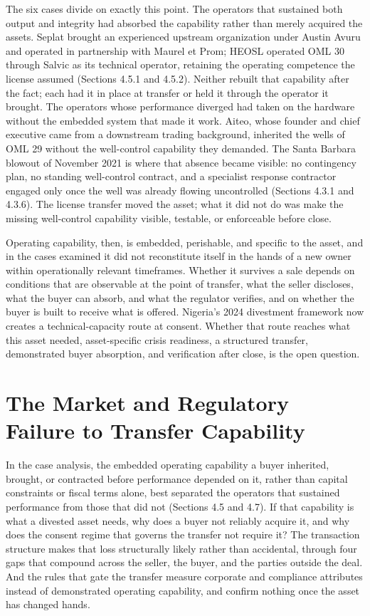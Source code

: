 \documentclass[twoside,fontset=lmodern]{mitthesis}
\begin{document}
The six cases divide on exactly this point. The operators that sustained
both output and integrity had absorbed the capability rather than merely
acquired the assets. Seplat brought an experienced upstream organization
under Austin Avuru and operated in partnership with Maurel et Prom;
HEOSL operated OML 30 through Salvic as its technical operator,
retaining the operating competence the license assumed (Sections 4.5.1
and 4.5.2). Neither rebuilt that capability after the fact; each had it
in place at transfer or held it through the operator it brought. The
operators whose performance diverged had taken on the hardware without
the embedded system that made it work. Aiteo, whose founder and chief
executive came from a downstream trading background, inherited the wells
of OML 29 without the well-control capability they demanded. The Santa
Barbara blowout of November 2021 is where that absence became visible:
no contingency plan, no standing well-control contract, and a specialist
response contractor engaged only once the well was already flowing
uncontrolled (Sections 4.3.1 and 4.3.6). The license transfer moved the
asset; what it did not do was make the missing well-control capability
visible, testable, or enforceable before close.

Operating capability, then, is embedded, perishable, and specific to the
asset, and in the cases examined it did not reconstitute itself in the
hands of a new owner within operationally relevant timeframes. Whether
it survives a sale depends on conditions that are observable at the
point of transfer, what the seller discloses, what the buyer can absorb,
and what the regulator verifies, and on whether the buyer is built to
receive what is offered. Nigeria's 2024 divestment framework now creates
a technical-capacity route at consent. Whether that route reaches what
this asset needed, asset-specific crisis readiness, a structured
transfer, demonstrated buyer absorption, and verification after close,
is the open question.

\hypertarget{the-market-and-regulatory-failure-to-transfer-capability}{%
\section{The Market and Regulatory Failure to Transfer
Capability}\label{the-market-and-regulatory-failure-to-transfer-capability}}

In the case analysis, the embedded operating capability a buyer
inherited, brought, or contracted before performance depended on it,
rather than capital constraints or fiscal terms alone, best separated
the operators that sustained performance from those that did not
(Sections 4.5 and 4.7). If that capability is what a divested asset
needs, why does a buyer not reliably acquire it, and why does the
consent regime that governs the transfer not require it? The transaction
structure makes that loss structurally likely rather than accidental,
through four gaps that compound across the seller, the buyer, and the
parties outside the deal. And the rules that gate the transfer measure
corporate and compliance attributes instead of demonstrated operating
capability, and confirm nothing once the asset has changed hands.
\end{document}

